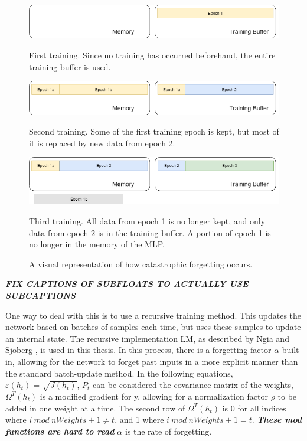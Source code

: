 	\begin{figure}[ht]
		\centering
		\begin{subfloat}%
			\centering
			\includegraphics[width=\textwidth]{figures/CatastrophicForgettingA}
			\caption{First training. Since no training has occurred beforehand, the entire training buffer is used.}
		\end{subfloat}
		\begin{subfloat}
		\centering
		\includegraphics[width=\textwidth]{figures/CatastrophicForgettingB}
		\caption{Second training. Some of the first training epoch is kept, but most of it is replaced by new data from epoch 2.}
	\end{subfloat}%
	\begin{subfloat}
	\centering
	\includegraphics[width=\textwidth]{figures/CatastrophicForgettingC}
	\caption{Third training. All data from epoch 1 is no longer kept, and only data from epoch 2 is in the training buffer. A portion of epoch 1 is no longer in the memory of the MLP.}
	\end{subfloat}%
	\caption{A visual representation of how catastrophic forgetting occurs.}
	
	\end{figure}
	\par \textbf{\textit{FIX CAPTIONS OF SUBFLOATS TO ACTUALLY USE SUBCAPTIONS}}
	\par One way to deal with this is to use a recursive training method. This updates the network based on batches of samples each time, but uses these samples to update an internal state. The recursive implementation LM, as described by Ngia and Sjoberg \cite{placeholderCitation}, is used in this thesis. In this process, there is a forgetting factor $\alpha$ built in, allowing for the network to forget past inputs in a more explicit manner than the standard batch-update method. In the following equations, $\varepsilon(h_t) = \sqrt{J(h_t)}$, $P_t$ can be considered the covariance matrix of the weights, $\Omega^T(h_t)$ is a modified gradient for y, allowing for a normalization factor $\rho$ to be added in one weight at a time. The second row of $\Omega^T(h_t)$ is 0 for all indices where $i\ mod\ nWeights+1 \neq t$, and 1 where $i\ mod\ nWeights+1 = t$. \textbf{\textit{These mod functions are hard to read}} $\alpha$ is the rate of forgetting. 
